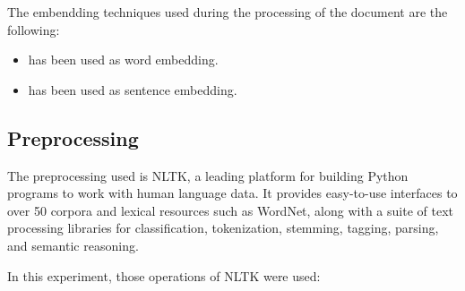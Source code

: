 \documentclass[12pt, a4paper]{article}
\begin{document}
\hfill\break
\hfill\break

 The embendding techniques used during the processing of the document are the following:
\begin{itemize}
   \item
        \begin{minipage}[t]{\linewidth}
         has been used as word embedding.
        \end{minipage}  
   \item
        \begin{minipage}[t]{\linewidth}
            has been used as sentence embedding.
         \end{minipage}  
\end{itemize}

\hfill\break

\subsection{Preprocessing}\label{subsec:preprocessing}
The preprocessing used is NLTK, a leading platform for building Python programs to work with human language data.
It provides easy-to-use interfaces to over 50 corpora and lexical resources such as WordNet,
along with a suite of text processing libraries for classification, tokenization, stemming, tagging, parsing,
and semantic reasoning.

\hfill\break
In this experiment, those operations of NLTK were used:
\end{document}
